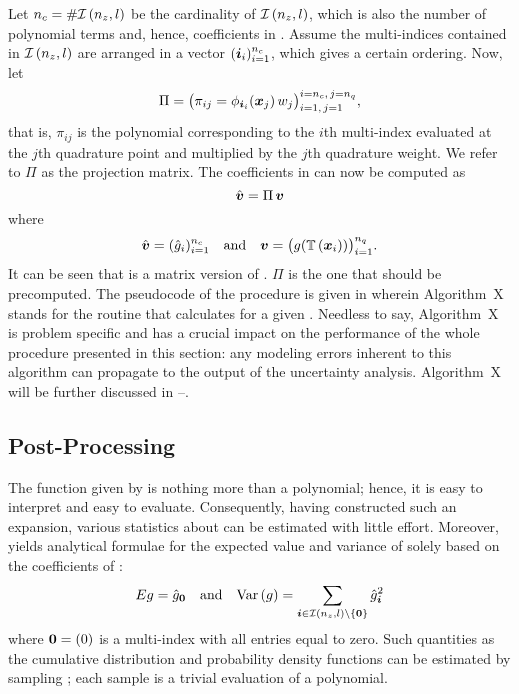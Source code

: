 Let ${n_{c}} = \# \mathcal{I}\left({n_{z}}, l\right)$ be the cardinality of
$\mathcal{I}\left({n_{z}}, l\right)$, which is also the number of polynomial terms and,
hence, coefficients in . Assume the multi-indices
contained in $\mathcal{I}\left({n_{z}}, l\right)$ are arranged in a vector
$(\boldsymbol{i}_i)_{i = 1}^{n_{c}}$, which gives a certain ordering. Now, let
\[
  \Pi = \big( \pi_{ij} = \phi_{\boldsymbol{i}_i}(\boldsymbol{x}_j) \, w_j \big)_{i = 1, \, j = 1}^{i = {n_{c}}, \, j = {n_{q}}},
\]
that is, $\pi_{ij}$ is the polynomial corresponding to the $i$th multi-index
evaluated at the $j$th quadrature point and multiplied by the $j$th quadrature
weight. We refer to $\Pi$ as the projection matrix. The coefficients in
 can now be computed as
\[
  \hat{\boldsymbol{v}} = \Pi \, \boldsymbol{v}
\]
where
\[
  \hat{\v{v}} = (\hat{\g}_i)_{i = 1}^\nc \hspace{1em} \text{and} \hspace{1em}
  \v{v} = \big(\g(\transform{\v{x}_i}) \big)_{i = 1}^\nq.
\]
It can be seen that  is a matrix version of
. $\Pi$ is the one that should be precomputed. The
pseudocode of the procedure is given in  wherein
Algorithm~X stands for the routine that calculates \g for a given \vu. Needless
to say, Algorithm~X is problem specific and has a crucial impact on the
performance of the whole procedure presented in this section: any modeling
errors inherent to this algorithm can propagate to the output of the uncertainty
analysis. Algorithm~X will be further discussed in
--.

\subsection{Post-Processing}

The function given by  is nothing more than a
polynomial; hence, it is easy to interpret and easy to evaluate. Consequently,
having constructed such an expansion, various statistics about \g can be
estimated with little effort. Moreover,  yields
analytical formulae for the expected value and variance of \g solely based on
the coefficients of :
\[
  \expectation{\g} = \hat{\g}_{\v{0}} \hspace{1em} \text{and} \hspace{1em}
  \variance{\g} = \sum_{\multiindex \in \multiindices{\nz}{l} \setminus \{ \v{0} \}} \hat{\g}_{\multiindex}^2
\]
where $\boldsymbol{0} = (0)$ is a multi-index with all entries equal to zero. Such
quantities as the cumulative distribution and probability density functions can
be estimated by sampling ; each sample is a trivial
evaluation of a polynomial.

